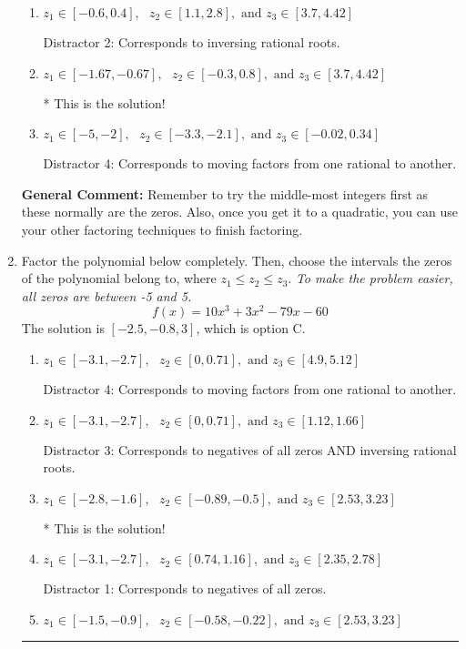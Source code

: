 \documentclass{extbook}[14pt]
\newcommand{\litem}[1]{\item #1

\rule{\textwidth}{0.4pt}}
\begin{document}
\begin{enumerate}
{\begin{enumerate}[label=\Alph*.]
 Distractor 3: Corresponds to negatives of all zeros AND inversing rational roots.
\item \( z_1 \in [-0.6, 0.4], \text{   }  z_2 \in [1.1, 2.8], \text{   and   } z_3 \in [3.7, 4.42] \)

 Distractor 2: Corresponds to inversing rational roots.
\item \( z_1 \in [-1.67, -0.67], \text{   }  z_2 \in [-0.3, 0.8], \text{   and   } z_3 \in [3.7, 4.42] \)

* This is the solution!
\item \( z_1 \in [-5, -2], \text{   }  z_2 \in [-3.3, -2.1], \text{   and   } z_3 \in [-0.02, 0.34] \)

 Distractor 4: Corresponds to moving factors from one rational to another.
\end{enumerate}

\textbf{General Comment:} Remember to try the middle-most integers first as these normally are the zeros. Also, once you get it to a quadratic, you can use your other factoring techniques to finish factoring.
}
\litem{
Factor the polynomial below completely. Then, choose the intervals the zeros of the polynomial belong to, where $z_1 \leq z_2 \leq z_3$. \textit{To make the problem easier, all zeros are between -5 and 5.}
\[ f(x) = 10x^{3} +3 x^{2} -79 x -60 \]The solution is \( [-2.5, -0.8, 3] \), which is option C.\begin{enumerate}[label=\Alph*.]
\item \( z_1 \in [-3.1, -2.7], \text{   }  z_2 \in [0, 0.71], \text{   and   } z_3 \in [4.9, 5.12] \)

 Distractor 4: Corresponds to moving factors from one rational to another.
\item \( z_1 \in [-3.1, -2.7], \text{   }  z_2 \in [0, 0.71], \text{   and   } z_3 \in [1.12, 1.66] \)

 Distractor 3: Corresponds to negatives of all zeros AND inversing rational roots.
\item \( z_1 \in [-2.8, -1.6], \text{   }  z_2 \in [-0.89, -0.5], \text{   and   } z_3 \in [2.53, 3.23] \)

* This is the solution!
\item \( z_1 \in [-3.1, -2.7], \text{   }  z_2 \in [0.74, 1.16], \text{   and   } z_3 \in [2.35, 2.78] \)

 Distractor 1: Corresponds to negatives of all zeros.
\item \( z_1 \in [-1.5, -0.9], \text{   }  z_2 \in [-0.58, -0.22], \text{   and   } z_3 \in [2.53, 3.23] \)


\end{enumerate}}
\end{enumerate}
\end{document}
